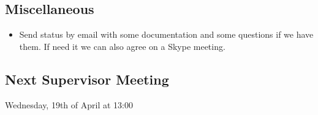 \subsection{Miscellaneous}
\begin{itemize}
    \item Send status by email with some documentation and some questions if we have them. If need it we can also agree on a Skype meeting.
\end{itemize}

\subsection{Next Supervisor Meeting}
Wednesday, 19th of April at 13:00

